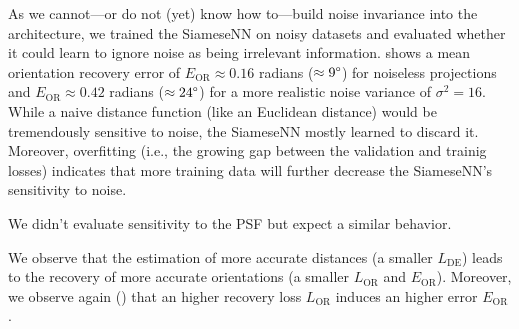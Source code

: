 As we cannot---or do not (yet) know how to---build noise invariance into the architecture, we trained the SiameseNN on noisy datasets and evaluated whether it could learn to ignore noise as being irrelevant information.
 shows a mean orientation recovery error of $E_\text{OR} \approx 0.16$ radians ($\approx 9\degree$) for noiseless projections and $E_\text{OR} \approx 0.42$ radians ($\approx 24\degree$) for a more realistic noise variance of $\sigma^2=16$.
While a naive distance function (like an Euclidean distance) would be tremendously sensitive to noise, the SiameseNN mostly learned to discard it.
Moreover, overfitting (i.e., the growing gap between the validation and trainig losses) indicates that more training data will further decrease the SiameseNN's sensitivity to noise.

We didn't evaluate sensitivity to the PSF but expect a similar behavior.

We observe that the estimation of more accurate distances (a smaller $L_\text{DE}$) leads to the recovery of more accurate orientations (a smaller $L_\text{OR}$ and $E_\text{OR}$).
Moreover, we observe again () that an higher recovery loss $L_\text{OR}$ induces an higher error $E_\text{OR}$.


